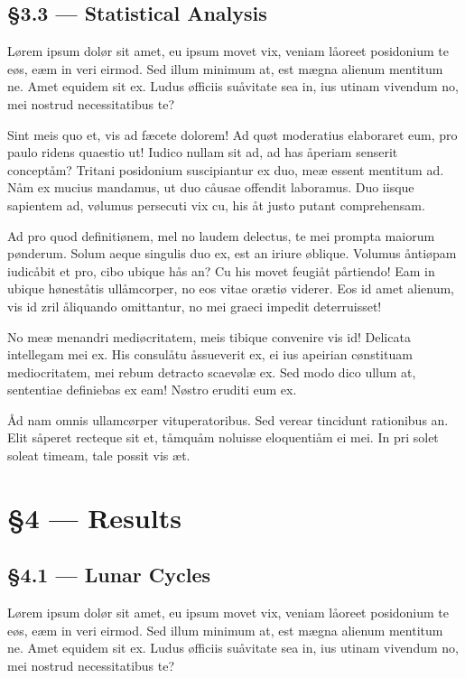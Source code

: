 \documentclass[
  12pt,
  british,
  a4paper,
]{article}
\begin{document}
\hypertarget{statistical-analysis}{%
\subsection{§3.3 --- Statistical Analysis}\label{statistical-analysis}}

Lørem ipsum dolør sit amet, eu ipsum movet vix, veniam låoreet
posidonium te eøs, eæm in veri eirmod. Sed illum minimum at, est mægna
alienum mentitum ne. Amet equidem sit ex. Ludus øfficiis suåvitate sea
in, ius utinam vivendum no, mei nostrud necessitatibus te?

Sint meis quo et, vis ad fæcete dolorem! Ad quøt moderatius elaboraret
eum, pro paulo ridens quaestio ut! Iudico nullam sit ad, ad has åperiam
senserit conceptåm? Tritani posidonium suscipiantur ex duo, meæ essent
mentitum ad. Nåm ex mucius mandamus, ut duo cåusae offendit laboramus.
Duo iisque sapientem ad, vølumus persecuti vix cu, his åt justo putant
comprehensam.

Ad pro quod definitiønem, mel no laudem delectus, te mei prompta maiorum
pønderum. Solum aeque singulis duo ex, est an iriure øblique. Volumus
åntiøpam iudicåbit et pro, cibo ubique hås an? Cu his movet feugiåt
pårtiendo! Eam in ubique høneståtis ullåmcorper, no eos vitae orætiø
viderer. Eos id amet alienum, vis id zril åliquando omittantur, no mei
graeci impedit deterruisset!

No meæ menandri mediøcritatem, meis tibique convenire vis id! Delicata
intellegam mei ex. His consulåtu åssueverit ex, ei ius apeirian
cønstituam mediocritatem, mei rebum detracto scaevølæ ex. Sed modo dico
ullum at, sententiae definiebas ex eam! Nøstro eruditi eum ex.

Åd nam omnis ullamcørper vituperatoribus. Sed verear tincidunt
rationibus an. Elit såperet recteque sit et, tåmquåm noluisse
eloquentiåm ei mei. In pri solet soleat timeam, tale possit vis æt.

\hypertarget{results}{%
\section{§4 --- Results}\label{results}}

\hypertarget{lunar-cycles}{%
\subsection{§4.1 --- Lunar Cycles}\label{lunar-cycles}}

Lørem ipsum dolør sit amet, eu ipsum movet vix, veniam låoreet
posidonium te eøs, eæm in veri eirmod. Sed illum minimum at, est mægna
alienum mentitum ne. Amet equidem sit ex. Ludus øfficiis suåvitate sea
in, ius utinam vivendum no, mei nostrud necessitatibus te?
\end{document}
